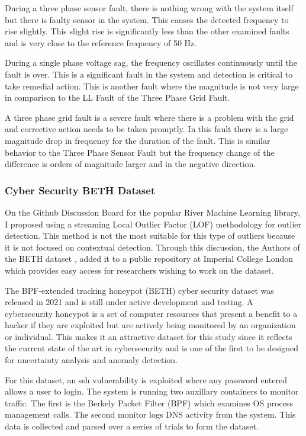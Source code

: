 During a three phase sensor fault, there is nothing wrong with the system itself but there is faulty sensor in the system. This causes the detected frequency to rise slightly. This slight rise is significantly less than the other examined faults and is very close to the reference frequency of 50 Hz. 

During a single phase voltage sag, the frequency oscillates continuously until the fault is over. This is a significant fault in the system and detection is critical to take remedial action. This is another fault where the magnitude is not very large in comparison to the LL Fault of the Three Phase Grid Fault.

A three phase grid fault is a severe fault where there is a problem with the grid and corrective action needs to be taken promptly. In this fault there is a large magnitude drop in frequency for the duration of the fault. This is similar behavior to the Three Phase Sensor Fault but the frequency change of the difference is orders of magnitude larger and in the negative direction.

\subsubsection{Cyber Security BETH Dataset}
\label{ref_beth_dataset}

On the Github Discussion Board \parencite{RiverGithub2022} for the popular River \parencite{2020river} Machine Learning library, I proposed using a streaming Local Outlier Factor (LOF) methodology for outlier detection. This method is not the most suitable for this type of outliers because it is not focused on contextual detection.  Through this discussion, the Authors of the BETH dataset \parencite{beth-dataset}, added it to a public repository at Imperial College London which provides easy access for researchers wishing to work on the dataset.

The BPF-extended tracking honeypot (BETH) cyber security dataset \parencite{beth-dataset} was released in 2021 and is still under active development and testing. A cybersecurity honeypot is a set of computer resources that present a benefit to a hacker if they are exploited but are actively being monitored by an organization or individual. This makes it an attractive dataset for this study since it reflects the current state of the art in cybersecurity and is one of the first to be designed for uncertainty analysis and anomaly detection. 

For this dataset, an ssh vulnerability is exploited where any password entered allows a user to login. The system is running two auxillary containers to monitor traffic. The first is the Berkely Packet Filter (BPF) which examines OS process management calls. The second monitor logs DNS activity from the system. This data is collected and parsed over a series of trials to form the dataset.

